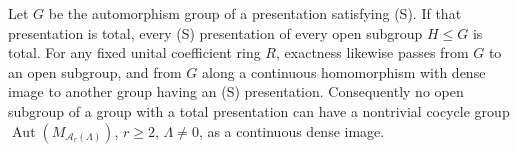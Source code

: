 

\begin{proposition}
\label{A:open-subgroups}
Let $G$ be the automorphism group of a presentation satisfying
\textup{(S)}. If that presentation is total, every \textup{(S)}
presentation of every open subgroup $H\leq G$ is total.
For any fixed unital coefficient ring $R$, exactness likewise
passes from $G$ to an open subgroup, and from $G$ along a
continuous homomorphism with dense image to another group
having an \textup{(S)} presentation.
Consequently no open subgroup of a group with a total
presentation can have a nontrivial cocycle group
$\operatorname{Aut}(M_{\mathcal A_r(\Lambda)})$, $r\geq2$,
$\Lambda\ne0$, as a continuous dense image.
\end{proposition}
